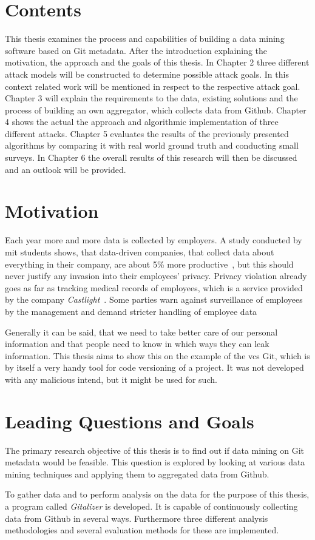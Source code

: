 \section{Contents}
This thesis examines the process and capabilities of building a data mining software based on Git metadata.
After the introduction explaining the motivation, the approach and the goals of this thesis.
In Chapter 2 three different attack models will be constructed to determine possible attack goals.
In this context related work will be mentioned in respect to the respective attack goal.
Chapter 3 will explain the requirements to the data, existing solutions and the process of building an own aggregator, which collects data from Github.
Chapter 4 shows the actual the approach and algorithmic implementation of three different attacks.
Chapter 5 evaluates the results of the previously presented algorithms by comparing it with real world ground truth and conducting small surveys.
In Chapter 6 the overall results of this research will then be discussed and an outlook will be provided.

\section{Motivation}
Each year more and more data is collected by employers.
A study conducted by \ac{mit} students shows, that data-driven companies, that collect data about everything in their company, are about 5\% more productive~\cite{article:management-revolution}, but this should never justify any invasion into their employees' privacy.
Privacy violation already goes as far as tracking medical records of employees, which is a service provided by the company \emph{Castlight}~\cite{article:medical-data}.
Some parties warn against surveillance of employees by the management and demand stricter handling of employee data~\cite{article:vermessung-belegschaft}

Generally it can be said, that we need to take better care of our personal information and that people need to know in which ways they can leak information.
This thesis aims to show this on the example of the \ac{vcs} Git, which is by itself a very handy tool for code versioning of a project.
It was not developed with any malicious intend, but it might be used for such.

\section{Leading Questions and Goals}

The primary research objective of this thesis is to find out if data mining on Git metadata would be feasible.
This question is explored by looking at various data mining techniques and applying them to aggregated data from Github.

To gather data and to perform analysis on the data for the purpose of this thesis, a program called \emph{Gitalizer} is developed.
It is capable of continuously collecting data from Github in several ways.
Furthermore three different analysis methodologies and several evaluation methods for these are implemented.
